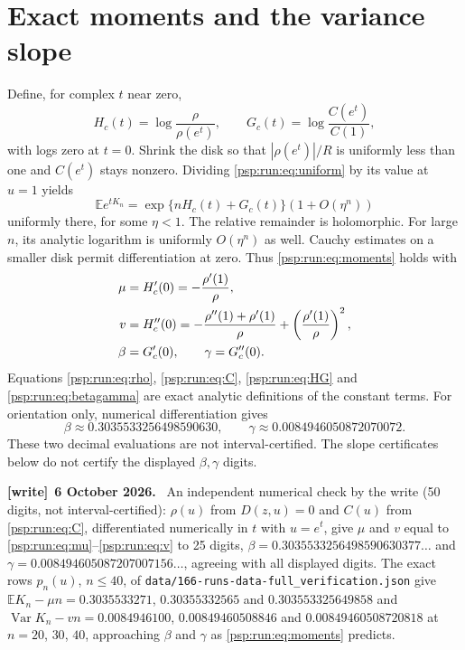 \documentclass[11pt,letterpaper]{article}
\numberwithin{equation}{section}
\theoremstyle{remark}\newtheorem{remark}[theorem]{Remark}
\newcommand{\Var}{\operatorname{Var}}
\newcommand{\EE}{\mathbb E}
\newcommand{\file}[1]{\nolinkurl{#1}}
\newenvironment{writenote}[1][]{\par\smallskip\begingroup\small
 \noindent\textbf{[write]}\if\relax\detokenize{#1}\relax\else~\textbf{#1.}\fi\ }%
 {\par\endgroup\smallskip}
\begin{document}
\section{Exact moments and the variance slope}\label{psp:run:sec:moments}
Define, for complex $t$ near zero,
\begin{equation}\label{psp:run:eq:HG}
 H_c(t)=\log\frac\rho{\rho(e^t)},\qquad
 G_c(t)=\log\frac{C(e^t)}{C(1)},
\end{equation}
with logs zero at $t=0$. Shrink the disk so that $|\rho(e^t)|/R$ is
uniformly less than one and $C(e^t)$ stays nonzero. Dividing
\eqref{psp:run:eq:uniform} by its value at $u=1$ yields
\begin{equation}\label{psp:run:eq:quasi}
 \EE e^{tK_n}=\exp\{nH_c(t)+G_c(t)\}(1+O(\eta^n))
\end{equation}
uniformly there, for some $\eta<1$. The relative remainder is holomorphic.
For large $n$, its analytic logarithm is uniformly $O(\eta^n)$ as well.
Cauchy estimates on a smaller disk permit differentiation at zero.
Thus \eqref{psp:run:eq:moments} holds with
\begin{align}
 \mu&=H_c'(0)=-\frac{\rho'(1)}\rho,\notag\\
 v&=H_c''(0)=-\frac{\rho''(1)+\rho'(1)}\rho+
                 \left(\frac{\rho'(1)}\rho\right)^2,\label{psp:run:eq:slopederivatives}\\
 \beta&=G_c'(0),\qquad \gamma=G_c''(0).\label{psp:run:eq:betagamma}
\end{align}
Equations \eqref{psp:run:eq:rho}, \eqref{psp:run:eq:C}, \eqref{psp:run:eq:HG} and
\eqref{psp:run:eq:betagamma} are exact analytic definitions of the constant terms.
For orientation only, numerical differentiation gives
\[
 \beta\approx0.3035533256498590630,\qquad
 \gamma\approx0.0084946050872070072.
\]
These two decimal evaluations are not interval-certified. The slope
certificates below do not certify the displayed $\beta,\gamma$ digits.
\begin{writenote}[6 October 2026]
An independent numerical check by the write (50 digits, not interval-certified): $\rho(u)$ from $D(z,u)=0$ and $C(u)$ from \eqref{psp:run:eq:C}, differentiated numerically in $t$ with $u=e^t$, give $\mu$ and $v$ equal to \eqref{psp:run:eq:mu}--\eqref{psp:run:eq:v} to 25 digits, $\beta=0.3035533256498590630377\ldots$ and $\gamma=0.008494605087207007156\ldots$, agreeing with all displayed digits. The exact rows $p_n(u)$, $n\le40$, of \file{data/166-runs-data-full_verification.json} give $\EE K_n-\mu n=0.3035533271$, $0.30355332565$ and $0.303553325649858$ and $\Var K_n-vn=0.0084946100$, $0.00849460508846$ and $0.00849460508720818$ at $n=20$, $30$, $40$, approaching $\beta$ and $\gamma$ as \eqref{psp:run:eq:moments} predicts.
\end{writenote}
\end{document}

